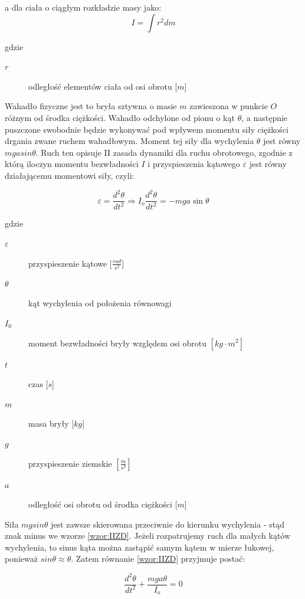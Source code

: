 \documentclass[a4paper,11pt]{article}
\begin{document}
a dla ciała o ciągłym rozkładzie masy jako:
\begin{equation}
I=\int r^{2}dm
\end{equation}

gdzie
\begin{description}
\item [$r$] odległość elementów ciała od osi obrotu [$m$]
\end{description}

\indent Wahadło fizyczne jest to bryła sztywna o masie $m$ zawieszona w punkcie $O$ różnym od środka ciężkości. Wahadło odchylone od pionu o kąt $\theta$, a następnie puszczone swobodnie będzie wykonywać pod wpływem momentu siły ciężkości drgania zwane ruchem wahadłowym. Moment tej siły dla wychylenia $\theta$ jest równy $mgasin\theta$. Ruch ten opisuje II zasada dynamiki dla ruchu obrotowego, zgodnie z którą iloczyn momentu bezwładności $I$  i przyspieszenia kątowego $\varepsilon$ jest równy działającemu momentowi siły, czyli:

\begin{equation}
\label{wzor:IIZD}
 \varepsilon = \frac{d^{2}\theta}{dt^{2}} \Rightarrow I_{o}\displaystyle \frac{d^{2}\theta}{dt^{2}}=-mga\sin\theta
\end{equation}

gdzie
\begin{description}
\item [$\varepsilon$] przyspieszenie kątowe [$\frac{rad}{s^{2}}$]
\item[$\theta$] kąt wychylenia od położenia równowagi
\item [$I_{0}$] moment bezwładności bryły względem osi obrotu $\left[ kg \cdot m^{2} \right]$
\item[$t$] czas [$s$]
\item[$m$] masa bryły [$kg$]
\item [$g$] przyspieszenie ziemskie $\left[\frac{m}{s^{2}} \right]$
\item [$a$] odległość osi obrotu od środka ciężkości [$m$]

\end{description}
\indent Siła $mgsin\theta$ jest zawsze skierowana przeciwnie do kierunku wychylenia - stąd znak minus we wzorze {\ref{wzor:IIZD}}.
Jeżeli rozpatrujemy ruch dla małych kątów wychylenia, to sinus kąta można zastąpić samym kątem w mierze łukowej, ponieważ $sin\theta \approx \theta$. Zatem równanie {\ref{wzor:IIZD}} przyjmuje postać: 

\begin{equation}
\frac{d^{2}\theta}{dt^{2}} + \dfrac{mga\theta}{I_{o}}=0
\end{equation}
\end{document}
